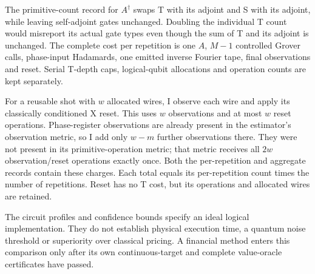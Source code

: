 The primitive-count record for $A^\dagger$ swaps T with its adjoint and S
with its adjoint, while leaving self-adjoint gates unchanged. Doubling the
individual T count would misreport its actual gate types even though the
sum of T and its adjoint is unchanged. The complete cost per repetition
is one $A$, $M-1$ controlled Grover calls, phase-input Hadamards, one emitted
inverse Fourier tape, final observations and reset. Serial T-depth caps,
logical-qubit allocations and operation counts are kept separately.

For a reusable shot with $w$ allocated wires, I observe each wire and apply
its classically conditioned X reset. This uses $w$ observations and at
most $w$ reset operations. Phase-register observations are already present
in the estimator's observation metric, so I add only $w-m$ further
observations there. They were not present in its primitive-operation metric;
that metric receives all $2w$ observation/reset operations exactly once.
Both the per-repetition and aggregate records contain these charges.
Each total equals its per-repetition count times the number of repetitions.
Reset has no T cost, but its operations and allocated wires are retained.

The circuit profiles and confidence bounds specify an ideal logical
implementation. They do not establish physical execution time, a quantum
noise threshold or superiority over classical pricing. A financial method
enters this comparison only after its own continuous-target and complete
value-oracle certificates have passed.
